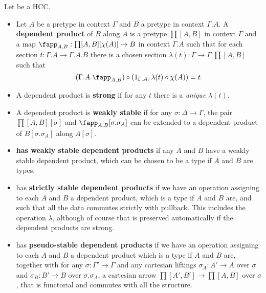 \documentclass{amsart}
\begin{document}
\begin{defn}
  Let \E be a HCC.
  \begin{itemize}
  \item Let $A$ be a pretype in context $\Gamma$ and $B$ a pretype in context $\Gamma.A$.
    A \textbf{dependent product} of $B$ along $A$ is a pretype $\prod[A,B]$ in context $\Gamma$ and a map $\fapp_{A,B} : \prod[A,B][\chi(A)] \to B$ in context $\Gamma.A$ such that for each section $t:\Gamma.A \to \Gamma.A.B$ there is a chosen section $\lambda(t):\Gamma \to \Gamma.\prod[A,B]$ such that
    \[(\Gamma.A.\fapp_{A,B})\circ (1_{\Gamma.A},\lambda(t) \circ \chi(A)) = t.\]
  \item A dependent product is \textbf{strong} if for any $t$ there is a \emph{unique} $\lambda(t)$.
  \item A dependent product is \textbf{weakly stable} if for any $\sigma:\Delta\to\Gamma$, the pair $\prod[A,B][\sigma]$ and $\fapp_{A,B}[\sigma.\sigma_A]$ can be extended to a dependent product of $B[\sigma.\sigma_A]$ along $A[\sigma]$.
  \item \E \textbf{has weakly stable dependent products} if any $A$ and $B$ have a weakly stable dependent product, which can be chosen to be a type if $A$ and $B$ are types.
  \item \E has \textbf{strictly stable dependent products} if we have an operation assigning to each $A$ and $B$ a dependent product, which is a type if $A$ and $B$ are, and such that all the data commutes strictly with pullback.
    This includes the operation $\lambda$, although of course that is preserved automatically if the dependent products are strong.
  \item \E has \textbf{pseudo-stable dependent products} if we have an operation assigning to each $A$ and $B$ a dependent product which is a type if $A$ and $B$ are, together with for any $\sigma:\Gamma'\to\Gamma$ and any cartesian liftings $\sigma_A: A' \to A$ over $\sigma$ and $\sigma_B: B'\to B$ over $\sigma.\sigma_A$, a cartesian arrow $\prod[A',B'] \to \prod[A,B]$ over $\sigma$, that is functorial and commutes with all the structure.
  \end{itemize}
\end{defn}
\end{document}
